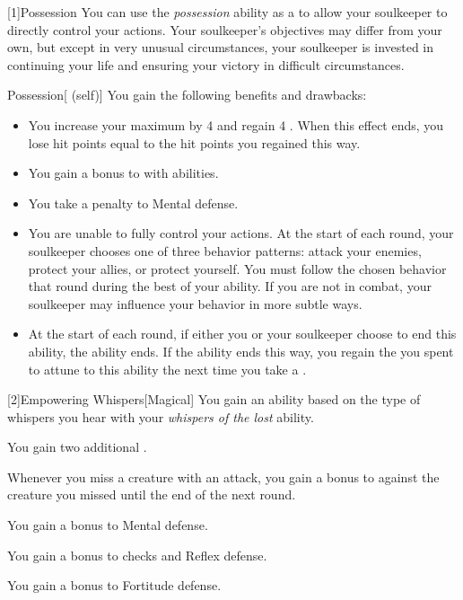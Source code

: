         [1]{Possession} You can use the \textit{possession} ability as a  to allow your soulkeeper to directly control your actions.
        Your soulkeeper's objectives may differ from your own, but except in very unusual circumstances, your soulkeeper is invested in continuing your life and ensuring your victory in difficult circumstances.
        \begin{attuneability}{Possession}[ (self)]
            You gain the following benefits and drawbacks:
            \begin{itemize}
                \item You increase your maximum  by 4 and regain 4 .
                    When this effect ends, you lose hit points equal to the hit points you regained this way.
                \item You gain a  bonus to  with  abilities.
                \item You take a  penalty to Mental defense.
                \item You are unable to fully control your actions.
                    At the start of each round, your soulkeeper chooses one of three behavior patterns: attack your enemies, protect your allies, or protect yourself.
                    You must follow the chosen behavior that round during the best of your ability.
                    If you are not in combat, your soulkeeper may influence your behavior in more subtle ways.
                \item At the start of each round, if either you or your soulkeeper choose to end this ability, the ability ends.
                    If the ability ends this way, you regain the  you spent to attune to this ability the next time you take a .
            \end{itemize}
        \end{attuneability}

        [2]{Empowering Whispers}[Magical]
        You gain an ability based on the type of whispers you hear with your \textit{whispers of the lost} ability.
        {
             You gain two additional .

             Whenever you miss a creature with an attack, you gain a  bonus to  against the creature you missed until the end of the next round.

             You gain a  bonus to Mental defense.

             You gain a  bonus to  checks and Reflex defense.

             You gain a  bonus to Fortitude defense.
        }

